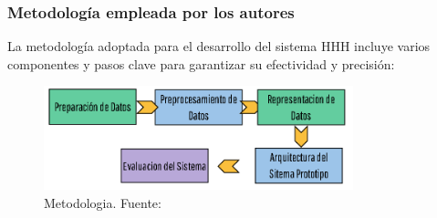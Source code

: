 \subsubsection{Metodología empleada por los autores}
La metodología adoptada para el desarrollo del sistema HHH incluye varios componentes y pasos clave para garantizar su efectividad y precisión:
	\begin{figure}[H]
		\begin{center}
			\includegraphics[width=0.8\textwidth]{2/1_antecedentes/Metodologia-6.png}
			\caption{Metodologia. Fuente: \cite{Medbot-2020} }
		\end{center}
	\end{figure}
	\vspace{-10mm}
